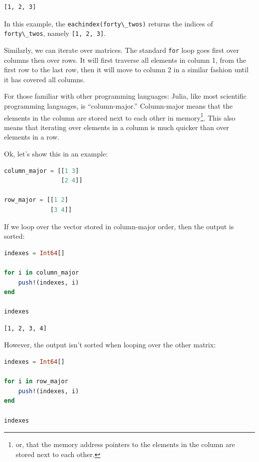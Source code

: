\documentclass[
  notoc %
]{tufte-book}
\newcommand{\passthrough}[1]{#1}
\begin{document}
\begin{lstlisting}[language=Output]
[1, 2, 3]
\end{lstlisting}

In this example, the \passthrough{\lstinline!eachindex(forty\_twos)!}
returns the indices of \passthrough{\lstinline!forty\_twos!}, namely
\passthrough{\lstinline![1, 2, 3]!}.

Similarly, we can iterate over matrices. The standard
\passthrough{\lstinline!for!} loop goes first over columns then over
rows. It will first traverse all elements in column 1, from the first
row to the last row, then it will move to column 2 in a similar fashion
until it has covered all columns.

For those familiar with other programming languages: Julia, like most
scientific programming languages, is ``column-major.'' Column-major
means that the elements in the column are stored next to each other in
memory\footnote{or, that the memory address pointers to the elements in
  the column are stored next to each other.}. This also means that
iterating over elements in a column is much quicker than over elements
in a row.

Ok, let's show this in an example:

\begin{lstlisting}[language=Julia]
column_major = [[1 3]
                [2 4]]

row_major = [[1 2]
             [3 4]]
\end{lstlisting}

If we loop over the vector stored in column-major order, then the output
is sorted:

\begin{lstlisting}[language=Julia]
indexes = Int64[]

for i in column_major
    push!(indexes, i)
end

indexes
\end{lstlisting}

\begin{lstlisting}[language=Output]
[1, 2, 3, 4]
\end{lstlisting}

However, the output isn't sorted when looping over the other matrix:

\begin{lstlisting}[language=Julia]
indexes = Int64[]

for i in row_major
    push!(indexes, i)
end

indexes
\end{lstlisting}
\end{document}
